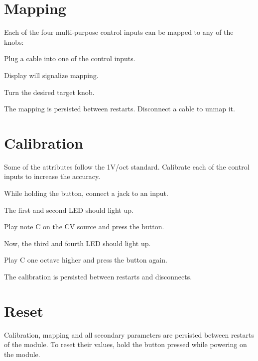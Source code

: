\documentclass[11pt]{article}
\newenvironment{packed_enumerate}{
\begin{enumerate}
  \setlength{\itemsep}{1pt}
  \setlength{\parskip}{0pt}
  \setlength{\parsep}{0pt}
}{\end{enumerate}}
\begin{document}
\begin{minipage}[t]{0.35\textwidth}
\setlength{\parskip}{6pt}

\section{Mapping}

Each of the four multi-purpose control inputs can be mapped to any of the knobs:

\begin{packed_enumerate}
  \item Plug a cable into one of the control inputs.
  \item Display will signalize mapping.
  \item Turn the desired target knob.
\end{packed_enumerate}

The mapping is persisted between restarts. Disconnect a cable to unmap it.

\section{Calibration}

Some of the attributes follow the 1V/oct standard. Calibrate each of the control inputs to increase the accuracy.

\begin{packed_enumerate}
  \item While holding the button, connect a jack to an input.
  \item The first and second LED should light up.
  \item Play note C on the CV source and press the button.
  \item Now, the third and fourth LED should light up.
  \item Play C one octave higher and press the button again.
\end{packed_enumerate}

The calibration is persisted between restarts and disconnects.

\section{Reset}

Calibration, mapping and all secondary parameters are persisted between restarts of the module. To reset their values, hold the button pressed while powering on the module.

\end{minipage}
\end{document}
